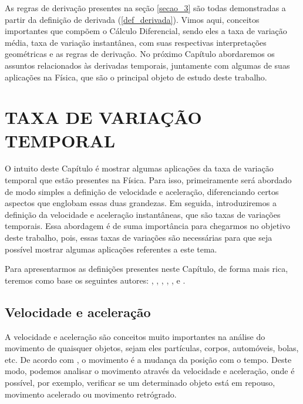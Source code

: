 \documentclass[
	12pt,				%
	openright,			%
    twoside,			%
	a4paper,			%
	chapter=TITLE,		%
	english,			%
	french,				%
	spanish,			%
	brazil				%
	]{abntex2}
\numberwithin{lema}{chapter}
\numberwithin{teorema}{chapter}
\numberwithin{definicao}{chapter}
\numberwithin{exemplo}{chapter}
\numberwithin{figure}{chapter}
\begin{document}
As regras de derivação presentes na seção \ref{secao_3} são todas demonstradas a partir da definição de derivada (\ref{def_derivada}). Vimos aqui, conceitos importantes que compõem o Cálculo Diferencial, sendo eles a taxa de variação média, taxa de variação instantânea, com suas respectivas interpretações geométricas e as regras de derivação. No próximo Capítulo abordaremos os assuntos relacionados às derivadas temporais, juntamente com algumas de suas aplicações na Física, que são o principal objeto de estudo deste trabalho.

\chapter{TAXA DE VARIAÇÃO TEMPORAL}
\label{capitulo_3}
\thispagestyle{empty}

O intuito deste Capítulo é mostrar algumas aplicações da taxa de variação temporal que estão presentes na Física. Para isso, primeiramente será abordado de modo simples a definição de velocidade e aceleração, diferenciando certos aspectos que englobam essas duas grandezas. Em seguida, introduziremos a definição da velocidade e aceleração instantâneas, que são taxas de variações temporais. Essa abordagem é de suma importância para chegarmos no objetivo deste trabalho, pois, essas taxas de variações são necessárias para que seja possível mostrar algumas aplicações referentes a este tema.

Para apresentarmos as definições presentes neste Capítulo, de forma mais rica, teremos como base os seguintes autores: , , , , ,  e .

\section{Velocidade e aceleração}
\label{secao_velocidade_aceleracao}

A velocidade e aceleração são conceitos muito importantes na análise do movimento de quaisquer objetos, sejam eles partículas, corpos, automóveis, bolas, etc. De acordo com , o movimento é a mudança da posição com o tempo. Deste modo, podemos analisar o movimento através da velocidade e aceleração, onde é possível, por exemplo, verificar se um determinado objeto está em repouso, movimento acelerado ou movimento retrógrado. 
\end{document}
